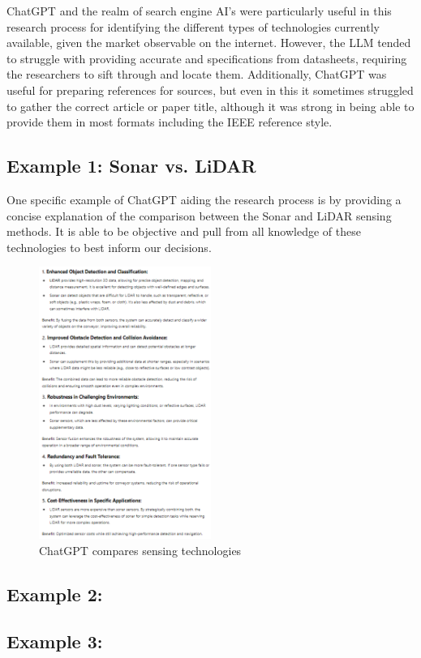 \noindent ChatGPT and the realm of search engine AI's were particularly useful in this research process for identifying the different types of technologies currently available, given the market observable on the internet. However, the LLM tended to struggle with providing accurate and specifications from datasheets, requiring the researchers to sift through and locate them. Additionally, ChatGPT was useful for preparing references for sources, but even in this it sometimes struggled to gather the correct article or paper title, although it was strong in being able to provide them in most formats including the IEEE reference style.\\

\subsection{Example 1: Sonar vs. LiDAR}
\noindent One specific example of ChatGPT aiding the research process is by providing a concise explanation of the comparison between the Sonar and LiDAR sensing methods. It is able to be objective and pull from all knowledge of these technologies to best inform our decisions.\\
\begin{figure}[H]
	\centering
	\includegraphics[width=0.5\textwidth]{./Images/chatgpt1.png}
	\caption{\label{fig:chatgpt1}ChatGPT compares sensing technologies}
\end{figure}

\subsection{Example 2: }

\subsection{Example 3: }